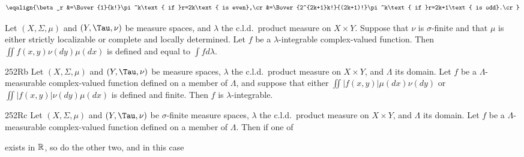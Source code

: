 $$\eqalign{\beta_r
&=\Bover{1}{k!}\pi^k\text{ if }r=2k\text{ is even},\cr
&=\Bover{2^{2k+1}k!}{(2k+1)!}\pi^k\text{ if }r=2k+1\text{ is odd}.\cr}$$



 Let $(X,\Sigma,\mu)$ and $(Y,\Tau,\nu)$ be
measure spaces, and $\lambda$ the c.l.d.\ product measure on $X\times
Y$.   Suppose that $\nu$ is $\sigma$-finite and that $\mu$ is either
strictly localizable or complete and locally determined.   Let $f$ be a
$\lambda$-integrable
complex-valued function.  Then $\iint f(x,y)\nu(dy)\mu(dx)$ is defined
and equal to $\int fd\lambda$.

\spheader 252Rb Let $(X,\Sigma,\mu)$ and $(Y,\Tau,\nu)$
be measure spaces, $\lambda$ the c.l.d.\ product measure on $X\times
Y$, and $\Lambda$ its domain.
Let $f$ be a $\Lambda$-measurable complex-valued function defined on a
member of $\Lambda$, and suppose that either
$\iint|f(x,y)|\mu(dx)\nu(dy)$ or $\iint|f(x,y)|\nu(dy)\mu(dx)$ is
defined and finite.   Then $f$ is $\lambda$-integrable.

\spheader 252Rc Let $(X,\Sigma,\mu)$ and $(Y,\Tau,\nu)$ be
$\sigma$-finite measure spaces, $\lambda$ the c.l.d.\ product
measure on $X\times Y$, and $\Lambda$ its domain.   Let $f$ be a
$\Lambda$-measurable complex-valued function defined on a member of
$\Lambda$.   Then if one of


\noindent exists in $\Bbb R$, so do the other two, and in this case


